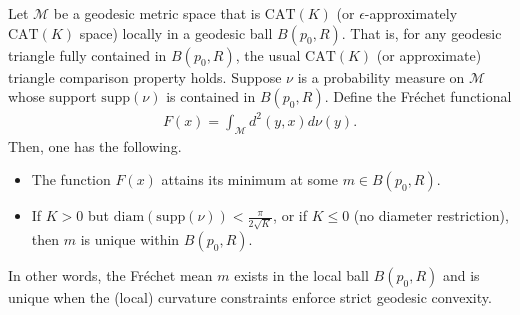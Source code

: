 \begin{proposition}
    \label{prp:local_existence_and_uniqueness}
    Let $\mathcal{M}$ be a geodesic metric space that is $\mathrm{CAT}(K)$ (or $\epsilon$-approximately $\mathrm{CAT}(K)$ space) locally in a geodesic ball $B(p_0, R)$.
    That is, for any geodesic triangle fully contained in $B(p_0, R)$, the usual $\mathrm{CAT}(K)$ (or approximate) triangle comparison property holds.
    Suppose $\nu$ is a probability measure on $\mathcal{M}$ whose support $\mathrm{supp}(\nu)$ is contained in $B(p_0, R)$.
    Define the Fréchet functional
    \begin{align*}
        F(x) = \int_\mathcal{M} d^2(y, x) d\nu(y).
    \end{align*}
    Then, one has the following.
    \begin{itemize}
        \item The function $F(x)$ attains its minimum at some $m \in B(p_0, R)$.
        \item If $K > 0$ but $\mathrm{diam}(\mathrm{supp}(\nu)) < \frac{\pi}{2\sqrt{K}}$, or if $K \leq 0$ (no diameter restriction), then $m$ is unique within $B(p_0, R)$.
    \end{itemize}
\end{proposition}
In other words, the Fréchet mean $m$ exists in the local ball $B(p_0, R)$ and is unique when the (local) curvature constraints enforce strict geodesic convexity.

